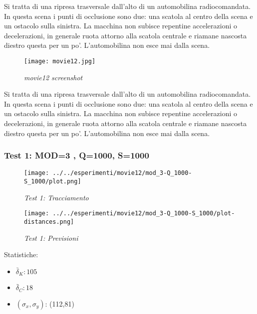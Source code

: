 Si tratta di una ripresa trasversale dall'alto di un automobilina radiocomandata. In questa scena i punti di occlusione sono due: una scatola al centro della scena e un ostacolo sulla sinistra. La macchina non subisce repentine accelerazioni o decelerazioni, in generale ruota attorno alla scatola centrale e riamane nascosta diestro questa per un po'. L'automobilina non esce mai dalla scena.

\begin{figure}[hb]
\centering
	\texttt{[image: movie12.jpg]}
\caption{\textit{movie12 screenshot}}
\end{figure}
 

Si tratta di una ripresa trasversale dall'alto di un automobilina radiocomandata. In questa scena i punti di occlusione sono due: una scatola al centro della scena e un ostacolo sulla sinistra. La macchina non subisce repentine accelerazioni o decelerazioni, in generale ruota attorno alla scatola centrale e riamane nascosta diestro questa per un po'. L'automobilina non esce mai dalla scena.

 
\newpage
\subsubsection{Test 1: MOD=3 , Q=1000, S=1000}

\begin{figure}[hb]
\centering
	\texttt{[image: ../../esperimenti/movie12/mod\_3-Q\_1000-S\_1000/plot.png]}
\caption{\textit{Test 1: Tracciamento}}
\end{figure}

\begin{figure}[hb]
\centering
	\texttt{[image: ../../esperimenti/movie12/mod\_3-Q\_1000-S\_1000/plot-distances.png]}
\caption{\textit{Test 1: Previsioni}}
\end{figure}

Statistiche:
\begin{itemize}
\item \begin{math} \bar \delta_K: 105 \end{math}
\item \begin{math} \bar \delta_C: 18 \end{math}
\item \begin{math}(\sigma_x,\sigma_y)\end{math}: (112,81)
\end{itemize}

